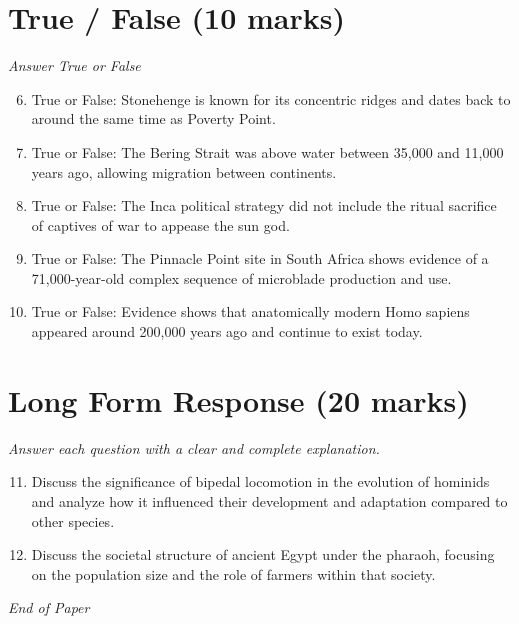 \documentclass[12pt]{article}
\begin{document}
\section*{True / False (10 marks)}
\textit{Answer True or False}
\begin{enumerate}[label=\arabic*.]
\setcounter{enumi}{5}
\item True or False: Stonehenge is known for its concentric ridges and dates back to around the same time as Poverty Point.
\item True or False: The Bering Strait was above water between 35,000 and 11,000 years ago, allowing migration between continents.
\item True or False: The Inca political strategy did not include the ritual sacrifice of captives of war to appease the sun god.
\item True or False: The Pinnacle Point site in South Africa shows evidence of a 71,000-year-old complex sequence of microblade production and use.
\item True or False: Evidence shows that anatomically modern Homo sapiens appeared around 200,000 years ago and continue to exist today.
\end{enumerate}

\section*{Long Form Response (20 marks)}
\textit{Answer each question with a clear and complete explanation.}
\begin{enumerate}[label=\arabic*.]
\setcounter{enumi}{10}
\item Discuss the significance of bipedal locomotion in the evolution of hominids and analyze how it influenced their development and adaptation compared to other species.
\item Discuss the societal structure of ancient Egypt under the pharaoh, focusing on the population size and the role of farmers within that society.
\end{enumerate}

\vfill
\noindent\textit{End of Paper}
\end{document}
